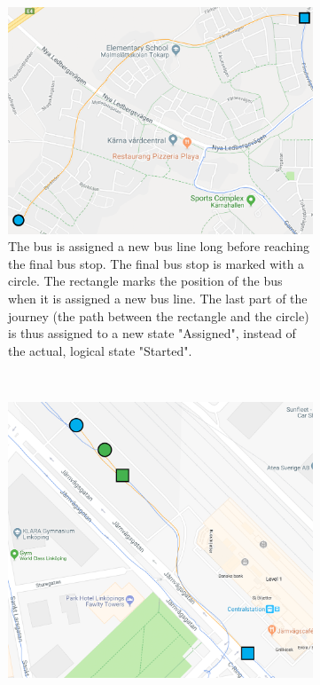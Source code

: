 \begin{figure}[h!]
    \centering
    \begin{subfigure}[t]{0.6\textwidth}
        \centering
        \includegraphics[width=\textwidth]{figures/assigned_completed_problem_long}
        \caption[]
        {\small The bus is assigned a new bus line long before reaching the final bus stop.
        The final bus stop is marked with a circle.
        The rectangle marks the position of the bus when it is assigned a new bus line.
        The last part of the journey (the path between the rectangle and the circle) is thus assigned to a new state "Assigned", instead of the actual, logical state "Started".}
        \label{fig:assigned-before-completed-long}
    \end{subfigure}
    ~
    \begin{subfigure}[t]{0.6\textwidth}
        \centering
        \includegraphics[width=\textwidth]{figures/assigned_completed_problem}

\end{subfigure}
\end{figure}
